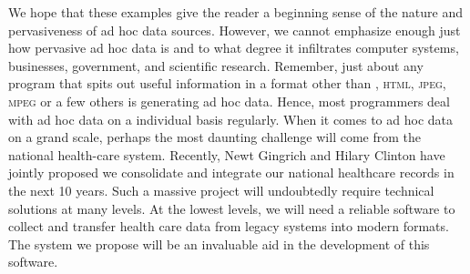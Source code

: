 We hope that these examples give the reader a beginning sense of the
nature and pervasiveness of ad hoc data sources.  However, we cannot
emphasize enough just how pervasive ad hoc data is and to what degree
it infiltrates computer systems, businesses, government, and
scientific research.  Remember, just about any program that spits out
useful information in a format other than \xml{}, \textsc{html},
\textsc{jpeg}, \textsc{mpeg} or a few others is generating ad hoc
data.  Hence, most programmers deal with ad hoc data on a individual
basis regularly.  When it comes to ad hoc data on a grand scale,
perhaps the most daunting challenge will come from the national
health-care system.  Recently, Newt Gingrich and Hilary Clinton have
jointly proposed we consolidate and integrate our national healthcare
records in the next 10 years.  Such a massive project will undoubtedly
require technical solutions at many levels.  At the lowest levels, we
will need a reliable software to collect and transfer health care data
from legacy systems into modern formats.  The \datatype{} system we
propose will be an invaluable aid in the development of this software.

